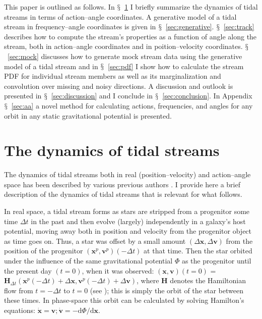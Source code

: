 \documentclass[12pt,preprint]{aastex}
\newcommand{\dd}{\mathrm{d}}
\newcommand{\eg}{e.g.}
\newcommand{\sectionname}{$\mathsection$}
\renewcommand{\vec}[1]{\ensuremath{\mathbf{#1}}}
\newcommand{\vecx}{\ensuremath{\vec{x}}}
\newcommand{\vecv}{\ensuremath{\vec{v}}}
\newcommand{\vech}{\ensuremath{\vec{H}}}
\begin{document}
This paper is outlined as follows. In \sectionname~\ref{sec:dynamics}
I briefly summarize the dynamics of tidal streams in terms of
action--angle coordinates. A generative model of a tidal stream in
frequency--angle coordinates is given in
\sectionname~\ref{sec:generative}. \sectionname~\ref{sec:track}
describes how to compute the stream's properties as a function of
angle along the stream, both in action--angle coordinates and in
poition--velocity coordinates. \sectionname~\ref{sec:mock} discusses
how to generate mock stream data using the generative model of a tidal
stream and in \sectionname~\ref{sec:pdf} I show how to calculate the
stream PDF for individual stream members as well as its
marginalization and convolution over missing and noisy directions. A
discussion and outlook is presented in
\sectionname~\ref{sec:discussion} and I conclude in
\sectionname~\ref{sec:conclusion}. In Appendix
\sectionname~\ref{sec:aa} a novel method for calculating actions,
frequencies, and angles for any orbit in any static gravitational
potential is presented.




\section{The dynamics of tidal streams}\label{sec:dynamics}

The dynamics of tidal streams both in real (position--velocity) and
action--angle space has been described by various previous authors
\citep[\eg,][]{Helmi99a,Tremaine99a,SomeJohnstonPaper,Sanders13b}. I
provide here a brief description of the dynamics of tidal streams that
is relevant for what follows.

In real space, a tidal stream forms as stars are stripped from a
progenitor some time $\Delta t$ in the past and then evolve (largely)
independently in a galaxy's host potential, moving away both in
position and velocity from the progenitor object as time goes
on. Thus, a star was offset by a small amount $(\Delta \vecx,\Delta
\vecv)$ from the position of the progenitor $(\vecx^p,\vecv^p)(-\Delta
t)$ at that time. Then the star orbited under the influence of the
same gravitational potential $\Phi$ as the progenitor until the
present day $(t=0)$, when it was observed: $(\vecx,\vecv)(t=0)$ =
$\vech_{\Delta t}(\vecx^p(-\Delta t)+\Delta \vecx,\vecv^p(-\Delta
t)+\Delta \vecv)$, where $\vech$ denotes the Hamiltonian flow from
$t=-\Delta t$ to $t=0$ (see \citealt{binneytremaine}); this is simply
the orbit of the star between these times. In phase-space this orbit
can be calculated by solving Hamilton's equations: $\dot{\vecx} =
\vecv; \dot{\vecv} = - \dd \Phi / \dd \vecx$.
\end{document}
